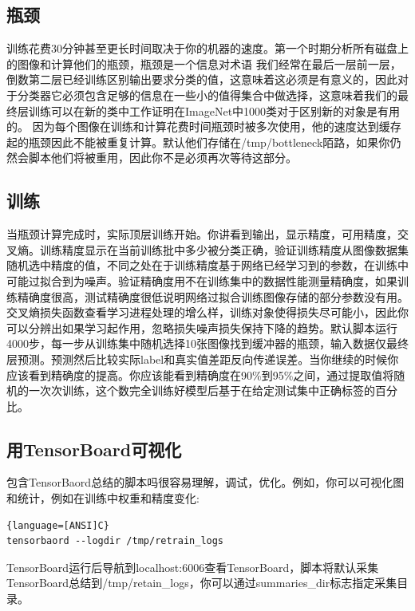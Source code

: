 \subsection{瓶颈}
训练花费30分钟甚至更长时间取决于你的机器的速度。第一个时期分析所有磁盘上的图像和计算他们的瓶颈，瓶颈是一个信息对术语
我们经常在最后一层前一层，倒数第二层已经训练区别输出要求分类的值，这意味着这必须是有意义的，因此对于分类器它必须包含足够的信息在一些小的值得集合中做选择，这意味着我们的最终层训练可以在新的类中工作证明在ImageNet中1000类对于区别新的对象是有用的。
因为每个图像在训练和计算花费时间瓶颈时被多次使用，他的速度达到缓存起的瓶颈因此不能被重复计算。默认他们存储在/tmp/bottleneck陌路，如果你仍然会脚本他们将被重用，因此你不是必须再次等待这部分。
\subsection{训练}
当瓶颈计算完成时，实际顶层训练开始。你讲看到输出，显示精度，可用精度，交叉熵。训练精度显示在当前训练批中多少被分类正确，验证训练精度从图像数据集随机选中精度的值，不同之处在于训练精度基于网络已经学习到的参数，在训练中可能过拟合到为噪声。验证精确度用不在训练集中的数据性能测量精确度，如果训练精确度很高，测试精确度很低说明网络过拟合训练图像存储的部分参数没有用。交叉熵损失函数查看学习进程处理的增么样，训练对象使得损失尽可能小，因此你可以分辨出如果学习起作用，忽略损失噪声损失保持下降的趋势。默认脚本运行4000步，每一步从训练集中随机选择10张图像找到缓冲器的瓶颈，输入数据仅最终层预测。预测然后比较实际label和真实值差距反向传递误差。当你继续的时候你应该看到精确度的提高。你应该能看到精确度在90\%到95\%之间，通过提取值将随机的一次次训练，这个数完全训练好模型后基于在给定测试集中正确标签的百分比。
\subsection{用TensorBoard可视化}
包含TensorBaord总结的脚本吗很容易理解，调试，优化。例如，你可以可视化图和统计，例如在训练中权重和精度变化:
\begin{lstlisting}{language=[ANSI]C}
tensorbaord --logdir /tmp/retrain_logs
\end{lstlisting}
TensorBoard运行后导航到localhost:6006查看TensorBoard，脚本将默认采集TensorBoard总结到/tmp/retain\_logs，你可以通过summaries\_dir标志指定采集目录。
